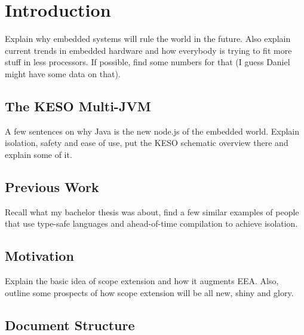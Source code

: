 
\chapter{Introduction}
	\label{chapter:intro}
	Explain why embedded systems will rule the world in the future. Also explain current trends in embedded hardware and
	how everybody is trying to fit more stuff in less processors. If possible, find some numbers for that (I guess Daniel
	might have some data on that).

	\section{The KESO Multi-JVM}
		\label{sec:intro:keso}
		A few sentences on why Java is the new node.js of the embedded world. Explain isolation, safety and ease of use, put
		the KESO schematic overview there and explain some of it.

	\section{Previous Work}
		\label{sec:intro:prev}
		Recall what my bachelor thesis was about, find a few similar examples of people that use type-safe languages and
		ahead-of-time compilation to achieve isolation.

	\section{Motivation}
		\label{sec:intro:motivation}
		Explain the basic idea of scope extension and how it augments EEA\@. Also, outline some prospects of how scope
		extension will be all new, shiny and glory.

	\section{Document Structure}
		\label{sec:intro:document-structure}
